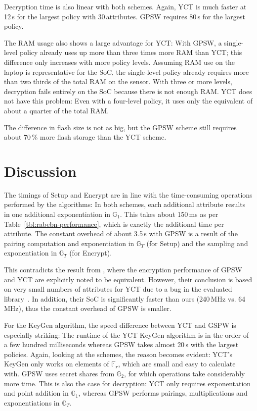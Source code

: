 Decryption time is also linear with both schemes.
Again, YCT is much faster at 12\,s for the largest policy with 30\,attributes. GPSW requires 80\,s for the largest policy.

The RAM usage also shows a large advantage for YCT:
With GPSW, a single-level policy already uses up more than three times more RAM than YCT; this difference only increases with more policy levels.
Assuming RAM use on the laptop is representative for the SoC, the single-level policy already requires more than two thirds of the total RAM on the sensor.
With three or more levels, decryption fails entirely on the SoC because there is not enough RAM.
YCT does not have this problem: Even with a four-level policy, it uses only the equivalent of about a quarter of the total RAM.

The difference in flash size is not as big, but the GPSW scheme still requires about 70\,\% more flash storage than the YCT scheme.


\section{Discussion}
The timings of Setup and Encrypt are in line with the time-consuming operations performed by the algorithms: 
In both schemes, each additional attribute results in one additional exponentiation in $\mathbb{G}_1$.
This takes about 150\,ms as per Table~\ref{tbl:rabebn-performance}, which is exactly the additional time per attribute.
The constant overhead of about 3.5\,s with GPSW is a result of the pairing computation and exponentiation in $\mathbb{G}_T$ (for Setup) and the sampling and exponentiation in $\mathbb{G}_T$ (for Encrypt).

This contradicts the result from \cite{girgenti_feasibility_2019}, where the encryption performance of GPSW and YCT are explicitly noted to be equivalent.
However, their conclusion is based on very small numbers of attributes for YCT due to a bug in the evaluated library~\cite{girgenti_feasibility_2019}.
In addition, their SoC is significantly faster than ours (240\,MHz vs. 64\,MHz), thus the constant overhead of GPSW is smaller.

For the KeyGen algorithm, the speed difference between YCT and GSPW is especially striking: 
The runtime of the YCT KeyGen algorithm is in the order of a few hundred milliseconds whereas GPSW takes almost 20\,s with the largest policies.
Again, looking at the schemes, the reason becomes evident: YCT's KeyGen only works on elements of $\mathbb{F}_r$, which are small and easy to calculate with.
GPSW uses secret shares from $\mathbb{G}_2$, for which operations take considerably more time.
This is also the case for decryption: YCT only requires exponentation and point addition in $\mathbb{G}_1$, whereas GPSW performs pairings, multiplications and exponentiations in $\mathbb{G}_T$.

